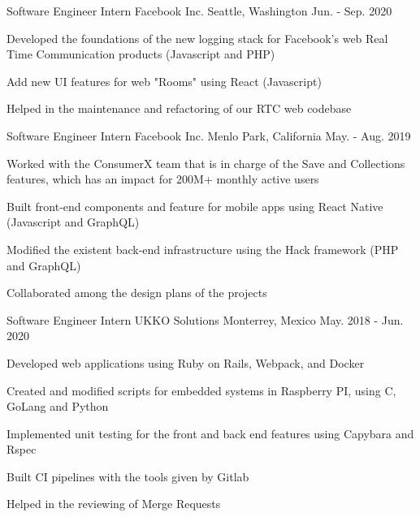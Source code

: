 \begin{cventries}
  \cventry
    {Software Engineer Intern} %
    {Facebook Inc.} %
    {Seattle, Washington} %
    {Jun. - Sep. 2020} %
    {
      \begin{cvitems} %
        \item {Developed the foundations of the new logging stack for Facebook's web Real Time Communication products (Javascript and PHP)}
        \item {Add new UI features for web "Rooms" using React (Javascript)}
        \item {Helped in the maintenance and refactoring of our RTC web codebase}
      \end{cvitems}
    }
  \cventry
    {Software Engineer Intern} %
    {Facebook Inc.} %
    {Menlo Park, California} %
    {May. - Aug. 2019} %
    {
      \begin{cvitems} %
        \item {Worked with the ConsumerX team that is in charge of the Save and Collections features, which has an impact for 200M+ monthly active users}
        \item {Built front-end components and feature for mobile apps using React Native (Javascript and GraphQL)}
        \item {Modified the existent back-end infrastructure using the Hack framework (PHP and GraphQL)}
        \item {Collaborated among the design plans of the projects}
      \end{cvitems}
    }
  \cventry
    {Software Engineer Intern} %
    {UKKO Solutions} %
    {Monterrey, Mexico} %
    {May. 2018 - Jun. 2020} %
    {
      \begin{cvitems} %
        \item {Developed web applications using Ruby on Rails, Webpack, and Docker}
        \item {Created and modified scripts for embedded systems in Raspberry PI, using C, GoLang and Python}
        \item {Implemented unit testing for the front and back end features using Capybara and Rspec}
        \item {Built CI pipelines with the tools given by Gitlab}
        \item {Helped in the reviewing of Merge Requests}
      \end{cvitems}
    }
\end{cventries}